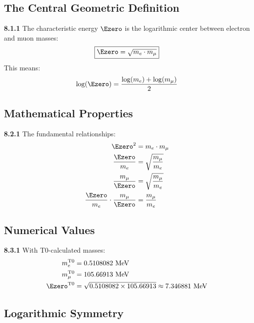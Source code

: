 \subsection{The Central Geometric Definition}

\begin{tcolorbox}[colback=yellow!10!white,colframe=red!75!black,title=Fundamental Definition]
	\noindent \textbf{8.1.1} The characteristic energy $\Ezero$ is the logarithmic center between electron and muon masses:
	\begin{equation}
		\boxed{\Ezero = \sqrt{m_e \cdot m_\mu}}
		\label{eq:E0_fundamental}
	\end{equation}
	This means:
	\begin{equation}
		\log(\Ezero) = \frac{\log(m_e) + \log(m_\mu)}{2}
		\label{eq:E0_logarithmic}
	\end{equation}
\end{tcolorbox}

\subsection{Mathematical Properties}

\noindent \textbf{8.2.1} The fundamental relationships:
\begin{align}
	\Ezero^2 &= m_e \cdot m_\mu \label{eq:E0_squared} \\
	\frac{\Ezero}{m_e} &= \sqrt{\frac{m_\mu}{m_e}} \label{eq:E0_ratio1} \\
	\frac{m_\mu}{\Ezero} &= \sqrt{\frac{m_\mu}{m_e}} \label{eq:E0_ratio2} \\
	\frac{\Ezero}{m_e} \cdot \frac{m_\mu}{\Ezero} &= \frac{m_\mu}{m_e} \label{eq:E0_product}
\end{align}

\subsection{Numerical Values}

\noindent \textbf{8.3.1} With T0-calculated masses:
\begin{align}
	m_e^{\text{T0}} &= 0.5108082 \text{ MeV} \\
	m_\mu^{\text{T0}} &= 105.66913 \text{ MeV} \\
	\Ezero^{\text{T0}} &= \sqrt{0.5108082 \times 105.66913} \approx 7.346881 \text{ MeV}
\end{align}

\subsection{Logarithmic Symmetry}

